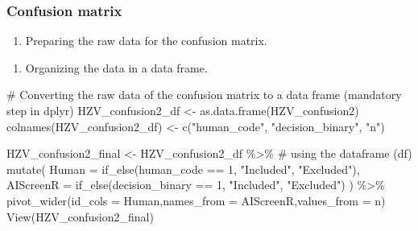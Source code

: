 \documentclass[
  letterpaper,
  DIV=11,
  numbers=noendperiod]{scrartcl}
\newenvironment{Shaded}{\begin{snugshade}}{\end{snugshade}}
\newcommand{\AttributeTok}[1]{\textcolor[rgb]{0.40,0.45,0.13}{#1}}
\newcommand{\CommentTok}[1]{\textcolor[rgb]{0.37,0.37,0.37}{#1}}
\newcommand{\DecValTok}[1]{\textcolor[rgb]{0.68,0.00,0.00}{#1}}
\newcommand{\FunctionTok}[1]{\textcolor[rgb]{0.28,0.35,0.67}{#1}}
\newcommand{\NormalTok}[1]{\textcolor[rgb]{0.00,0.23,0.31}{#1}}
\newcommand{\OtherTok}[1]{\textcolor[rgb]{0.00,0.23,0.31}{#1}}
\newcommand{\SpecialCharTok}[1]{\textcolor[rgb]{0.37,0.37,0.37}{#1}}
\newcommand{\StringTok}[1]{\textcolor[rgb]{0.13,0.47,0.30}{#1}}
\providecommand{\tightlist}{%
  \setlength{\itemsep}{0pt}\setlength{\parskip}{0pt}}
\begin{document}
\subsubsection{Confusion matrix}\label{confusion-matrix-1}

\begin{enumerate}
\def\labelenumi{\arabic{enumi}.}
\tightlist
\item
  Preparing the raw data for the confusion matrix.
\end{enumerate}

\begin{Shaded}
\end{Shaded}

\begin{enumerate}
\def\labelenumi{\arabic{enumi}.}
\setcounter{enumi}{1}
\tightlist
\item
  Organizing the data in a data frame.
\end{enumerate}

\begin{Shaded}
\begin{Highlighting}[]
\CommentTok{\# Converting the raw data of the confusion matrix to a data frame (mandatory step in dplyr)}
\NormalTok{HZV\_confusion2\_df }\OtherTok{\textless{}{-}} \FunctionTok{as.data.frame}\NormalTok{(HZV\_confusion2)}
\FunctionTok{colnames}\NormalTok{(HZV\_confusion2\_df) }\OtherTok{\textless{}{-}} \FunctionTok{c}\NormalTok{(}\StringTok{"human\_code"}\NormalTok{, }\StringTok{"decision\_binary"}\NormalTok{, }\StringTok{"n"}\NormalTok{)}

\NormalTok{HZV\_confusion2\_final }\OtherTok{\textless{}{-}}\NormalTok{ HZV\_confusion2\_df }\SpecialCharTok{\%\textgreater{}\%} \CommentTok{\# using the dataframe (df)}
  \FunctionTok{mutate}\NormalTok{(}
    \AttributeTok{Human =} \FunctionTok{if\_else}\NormalTok{(human\_code }\SpecialCharTok{==} \DecValTok{1}\NormalTok{, }\StringTok{"Included"}\NormalTok{, }\StringTok{"Excluded"}\NormalTok{),}
    \AttributeTok{AIScreenR =} \FunctionTok{if\_else}\NormalTok{(decision\_binary }\SpecialCharTok{==} \DecValTok{1}\NormalTok{, }\StringTok{"Included"}\NormalTok{, }\StringTok{"Excluded"}\NormalTok{)}
\NormalTok{  ) }\SpecialCharTok{\%\textgreater{}\%}
    \FunctionTok{pivot\_wider}\NormalTok{(}\AttributeTok{id\_cols =}\NormalTok{ Human,}\AttributeTok{names\_from =}\NormalTok{ AIScreenR,}\AttributeTok{values\_from =}\NormalTok{ n)}
\FunctionTok{View}\NormalTok{(HZV\_confusion2\_final)}
\end{Highlighting}
\end{Shaded}
\end{document}
